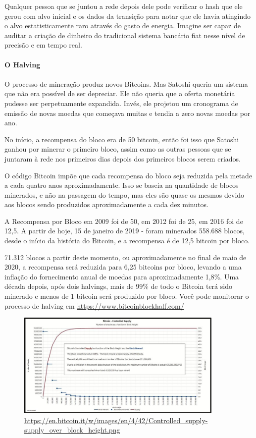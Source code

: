 Qualquer pessoa que se juntou a rede depois dele pode verificar o hash que ele gerou com alvo inicial e os dados da transição para notar que ele havia atingindo o alvo estatisticamente raro através do gasto de energia. Imagine ser capaz de auditar a criação de dinheiro do tradicional sistema bancário fiat nesse nível de precisão e em tempo real.

\paragraph{O Halving}
\paragraph{}
O processo de mineração produz novos Bitcoins. Mas Satoshi queria um sistema que não era possível de ser depreciar. Ele não queria que a oferta monetária pudesse ser perpetuamente expandida. Invés, ele projetou um cronograma de emissão de novas moedas que começava muitas e tendia a zero novas moedas por ano.

No início, a recompensa do bloco era de 50 bitcoin, então foi isso que Satoshi ganhou por minerar o primeiro bloco, assim como as outras pessoas que se juntaram à rede nos primeiros dias depois dos primeiros blocos serem criados.

O código Bitcoin impõe que cada recompensa do bloco seja reduzida pela metade a cada quatro anos aproximadamente. Isso se baseia na quantidade de blocos minerados, e não na passagem do tempo, mas eles são quase os mesmos devido aos blocos sendo produzidos aproximadamente a cada dez minutos.

A Recompensa por Bloco em 2009 foi de 50, em 2012 foi de 25, em 2016 foi de 12,5. A partir de hoje, 15 de janeiro de 2019 - foram minerados 558.688 blocos, desde o início da história do Bitcoin, e a recompensa é de 12,5 bitcoin por bloco.

71.312 blocos a partir deste momento, ou aproximadamente no final de maio de 2020, a recompensa será reduzida para 6,25 bitcoins por bloco, levando a uma inflação do fornecimento anual de moedas para aproximadamente 1,8\%. Uma década depois, após dois halvings, mais de 99\% de todo o Bitcoin terá sido minerado e menos de 1 bitcoin será produzido por bloco. Você pode monitorar o processo de halving em \url{https://www.bitcoinblockhalf.com/}

\begin{figure}
  \centering
  \includegraphics[width=10cm]{imagens/grafico-capitulo-05.jpg}
  \caption{\url{https://en.bitcoin.it/w/images/en/4/42/Controlled_supply-supply_over_block_height.png}}
\end{figure}

